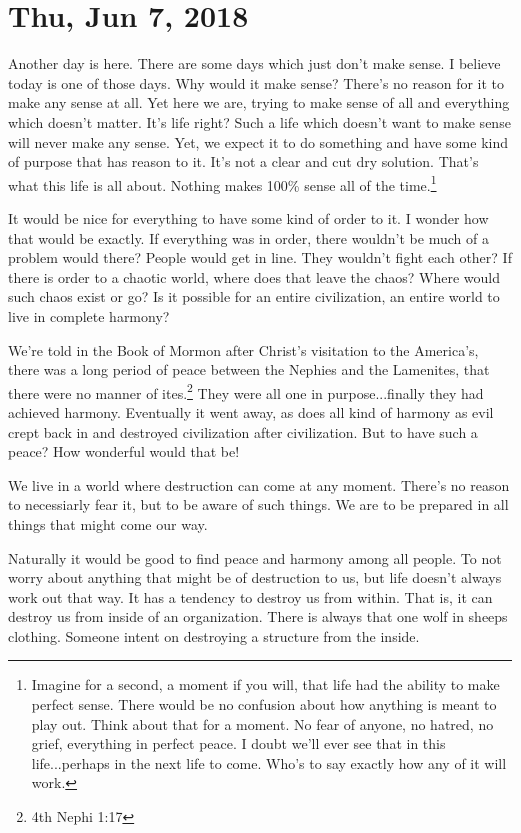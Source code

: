 \section{Thu, Jun 7, 2018}

Another day is here. There are some days which just don't make sense. I believe
today is one of those days. Why would it make sense? There's no reason for it to
make any sense at all. Yet here we are, trying to make sense of all and
everything which doesn't matter. It's life right? Such a life which doesn't want
to make sense will never make any sense. Yet, we expect it to do something and
have some kind of purpose that has reason to it. It's not a clear and cut dry
solution. That's what this life is all about. Nothing makes 100\% sense all of
the time.\footnote{Imagine for a second, a moment if you will, that life had
the ability to make perfect sense. There would be no confusion about how 
anything is meant to play out. Think about that for a moment. No fear of anyone,
no hatred, no grief, everything in perfect peace. I doubt we'll ever see that
in this life...perhaps in the next life to come. Who's to say exactly how any
of it will work.}

It would be nice for everything to have some kind of order to it. I wonder how
that would be exactly. If everything was in order, there wouldn't be much of a
problem would there? People would get in line. They wouldn't fight each other?
If there is order to a chaotic world, where does that leave the chaos? Where
would such chaos exist or go? Is it possible for an entire civilization, an
entire world to live in complete harmony?

We're told in the Book of Mormon after Christ's visitation to the America's,
there was a long period of peace between the Nephies and the Lamenites, that
there were no manner of ites.\footnote{4th Nephi 1:17} They were all one in 
purpose...finally they had achieved harmony. Eventually it went away, as does 
all kind of harmony as evil crept back in and destroyed civilization after 
civilization. But to have such a peace? How wonderful would that be!

We live in a world where destruction can come at any moment. There's no reason
to necessiarly fear it, but to be aware of such things. We are to be prepared in
all things that might come our way.

Naturally it would be good to find peace and harmony among all people. To not
worry about anything that might be of destruction to us, but life doesn't always
work out that way. It has a tendency to destroy us from within. That is, it can
destroy us from inside of an organization. There is always that one wolf in
sheeps clothing. Someone intent on destroying a structure from the inside.